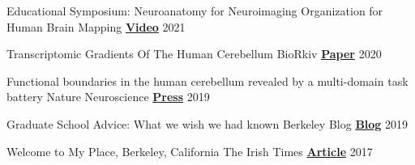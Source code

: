 

\begin{cvhonors}
    
  \cvhonor
    {Educational Symposium: Neuroanatomy for Neuroimaging} %
    {Organization for Human Brain Mapping}
    {\href{https://www.youtube.com/watch?v=L6nwkvBqJzI}{\textbf{Video}}}
    {2021}

  \cvhonor
    {Transcriptomic Gradients Of The Human Cerebellum} %
    {BioRkiv}
    {\href{https://papers.ssrn.com/sol3/papers.cfm?abstract_id=3797269}{\textbf{Paper}}}
    {2020}
    
  \cvhonor
    {Functional boundaries in the human cerebellum revealed by a multi-domain task battery} %
    {Nature Neuroscience}
    {\href{https://news.berkeley.edu/story_jump/cerebellum-map/}{\textbf{Press}}}
    {2019}
    
    


  \cvhonor
    {Graduate School Advice: What we wish we had known} %
    {Berkeley Blog}
    {\href{https://psychblog.berkeley.edu/opinion/2019/09/09/Graduate-School-Advice/}{\textbf{Blog}}}
    {2019}

  \cvhonor
    {Welcome to My Place, Berkeley, California} %
    {The Irish Times}
    {\href{https://www.irishtimes.com/life-and-style/abroad/welcome-to-my-place-berkeley-california-1.3325991}{\textbf{Article}}}
    {2017}

\end{cvhonors}
